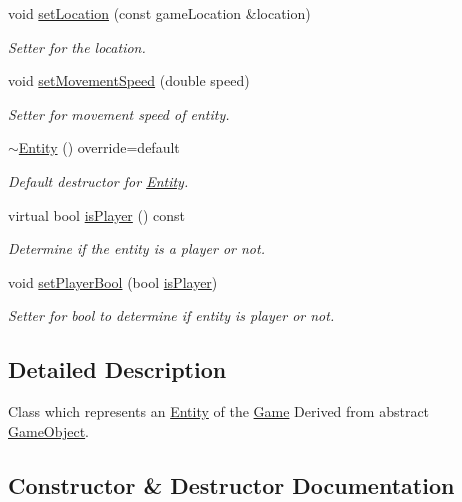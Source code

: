 \begin{DoxyCompactItemize}
void \hyperlink{classEntity_a70bfcbab042dfd1f1571e06d406985f4}{set\+Location} (const game\+Location \&location)
\begin{DoxyCompactList}\small\item\em Setter for the location. \end{DoxyCompactList}\item 
void \hyperlink{classEntity_a1ee8abc607182bd4dc3a650cafb98188}{set\+Movement\+Speed} (double speed)
\begin{DoxyCompactList}\small\item\em Setter for movement speed of entity. \end{DoxyCompactList}\item 
\mbox{\label{classEntity_a605d474ccbd30c3d4350016ec173546a}} 
\hyperlink{classEntity_a605d474ccbd30c3d4350016ec173546a}{$\sim$\+Entity} () override=default
\begin{DoxyCompactList}\small\item\em Default destructor for \hyperlink{classEntity}{Entity}. \end{DoxyCompactList}\item 
virtual bool \hyperlink{classEntity_a01357a3f88d3d7277cff951fa1a63add}{is\+Player} () const
\begin{DoxyCompactList}\small\item\em Determine if the entity is a player or not. \end{DoxyCompactList}\item 
void \hyperlink{classEntity_ad80d65640fe9dd1ae0a0660f02dc60f5}{set\+Player\+Bool} (bool \hyperlink{classEntity_a01357a3f88d3d7277cff951fa1a63add}{is\+Player})
\begin{DoxyCompactList}\small\item\em Setter for bool to determine if entity is player or not. \end{DoxyCompactList}\end{DoxyCompactItemize}


\subsection{Detailed Description}
Class which represents an \hyperlink{classEntity}{Entity} of the \hyperlink{classGame}{Game} Derived from abstract \hyperlink{classGameObject}{Game\+Object}. 

\subsection{Constructor \& Destructor Documentation}
\mbox{\label{classEntity_a0193c7a349273d65551c229ab1afabaf}} 
